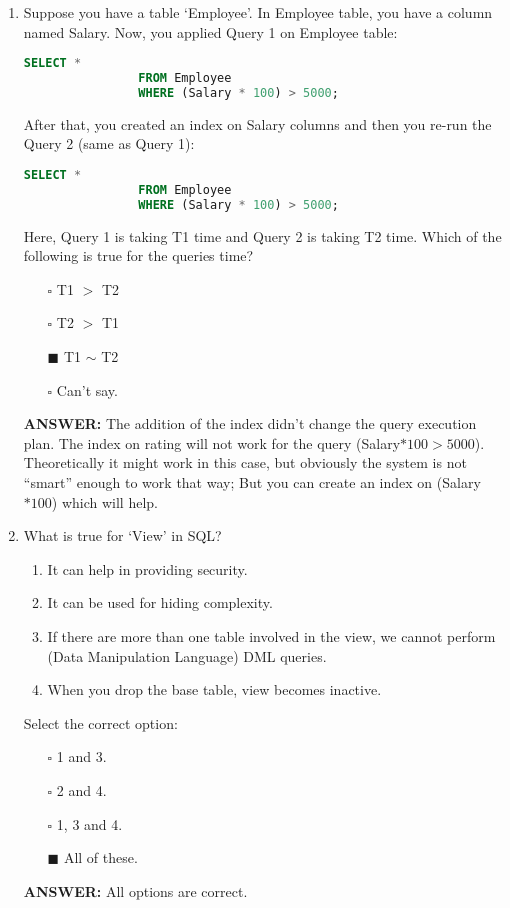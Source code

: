 \documentclass[10pt]{article}
\begin{document}
\begin{enumerate}
		\item Suppose you have a table ‘Employee’. In Employee table, you have a column named Salary. Now, you applied Query 1 on Employee table:
			\begin{lstlisting}[language=SQL,firstline=1, lastline=3] 
				SELECT * 
				FROM Employee 
				WHERE (Salary * 100) > 5000;
			\end{lstlisting}
			After that, you created an index on Salary columns and then you re-run the Query 2 (same as Query 1):
			\begin{lstlisting}[language=SQL,firstline=1, lastline=3] 
				SELECT * 
				FROM Employee 
				WHERE (Salary * 100) > 5000;
			\end{lstlisting}
			Here, Query 1 is taking T1 time and Query 2 is taking T2 time. Which of the following is true for the queries time?
			\begin{enumerate}
				\item[$\square$] T1 $>$ T2
				\item[$\square$] T2 $>$ T1
				\item[$\blacksquare$] T1 $\sim$ T2
				\item[$\square$] Can’t say.
			\end{enumerate}
			\color{red} \textbf{ANSWER:} \color{black} The addition of the index didn’t change the query execution plan.  The index on rating will not work for the query (Salary$* 100 > 5000$). Theoretically it might work in this case, but obviously the system is not “smart” enough to work that way; But you can create an index on (Salary$ * 100$) which will help.
			
		\newpage

		\item What is true for ‘View’ in SQL?
			\begin{enumerate}
				\item It can help in providing security.
				\item It can be used for hiding complexity.
				\item If there are more than one table involved in the view, we cannot perform (Data Manipulation Language) DML queries.
				\item When you drop the base table, view becomes inactive.
			\end{enumerate}
			Select the correct option:
			\begin{enumerate}
				\item[$\square$] 1 and 3.
				\item[$\square$] 2 and 4.
				\item[$\square$] 1, 3 and 4.
				\item[$\blacksquare$] All of these.
			\end{enumerate}
			\color{red} \textbf{ANSWER:} \color{black} All options are correct.


\end{enumerate}
\end{document}
